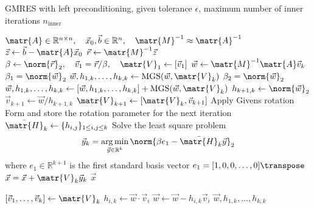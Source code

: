 \begin{singlespace}
  \begin{algorithm}[h]
    \caption{GMRES with left preconditioning, given tolerance \(\epsilon\), maximum
      number of inner iterations \(n_{\text{inner}}\)}
    \label{algo:gmres}
    \begin{algorithmic}[1]
      \State \(\matr{A} \in \mathbb{R}^{n \times n}, \quad \vec{x}_0, \vec{b} \in \mathbb{R}^n, \quad \matr{M}^{-1} \approx \matr{A}^{-1}\)
      \State \(\vec{z} \gets \vec{b} - \matr{A}\vec{x}_0\) 
      \State \(\vec{r} \gets \matr{M}^{-1}\vec{z}\) 
      \State \(\beta \gets \norm{\vec{r}}_2, \quad \vec{v}_1 = \vec{r} / \beta, \quad \matr{V}_1 \gets [\vec{v}_1]\) 
        \State \(\vec{w} \gets \matr{M}^{-1} \matr{A} \vec{v}_k\) 
        \State \(\beta_1 = \norm{\vec{w}}_2\)
        \State \(\vec{w}, h_{1,k}, \dots, h_{k,k} \gets \text{MGS}(\vec{w}, \matr{V}_k)\) 
        \State \(\beta_2 = \norm{\vec{w}}_2\)
         
          \State \(\vec{w}, h_{1,k}, \dots, h_{k,k} \gets [\vec{w}, h_{1,k}, \dots, h_{k,k}] +
          \text{MGS}(\vec{w}, \matr{V}_k)\) 
        \EndIf
        \State \(h_{k+1,k} \gets \norm{\vec{w}}_2\)
        \State \(\vec{v}_{k+1} \gets \vec{w} / h_{k+1,k}\)
        \State \(\matr{V}_{k+1} \gets [\matr{V}_k, \vec{v}_{k+1}]\) 
        \State Apply Givens rotation
        \State Form and store the rotation parameter for the next iteration
      \EndFor
      \State \(\bar{\matr{H}}_k \gets \{h_{i,j}\}_{1 \le i,j \le k}\) 
      \State Solve the least square problem \[\vec{y}_k = \argmin_{\vec{y}\in\mathbb{R}^k} \norm{\beta e_1 - \bar{\matr{H}}_k \vec{y}}_2\]
      where \(e_1 \in \mathbb{R}^{k + 1}\) is the first standard basis vector \(e_1 = [1, 0, 0, \dots, 0]\transpose\)
      \State \(\vec{x} = \vec{x} + \matr{V}_k \vec{y}_k\) 
      \State \Return \(\vec{x}\)

      \vspace{10pt}

       
        \State \([\vec{v}_1, \dots, \vec{v}_k] \gets \matr{V}_k\)
          \State \(h_{i,k} \gets \vec{w} \cdot \vec{v}_i\)
          \State \(\vec{w} \gets \vec{w} - h_{i,k} \vec{v}_i\)
        \EndFor
        \State \Return \(\vec{w}, h_{1,k}, \dots, h_{k,k}\)
      \EndProcedure
    \end{algorithmic}
  \end{algorithm}
\end{singlespace}

